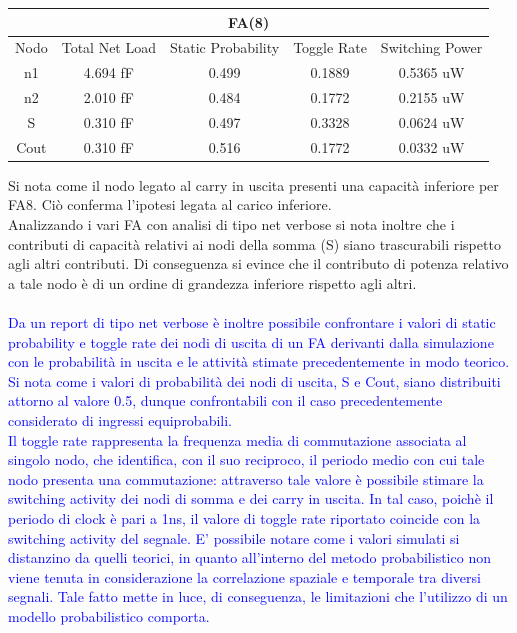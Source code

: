 \documentclass[11pt,  english, makeidx, a4paper, titlepage, oneside]{book}
\begin{document}
\vspace{0.3cm}
\begin{center}
	\begin{tabular}{|c|c|c|c|c|}
	\multicolumn{5}{c}{FA(8) }\\
	\hline
	Nodo &  Total Net Load & Static Probability & Toggle Rate & Switching Power \\ 
	\hline
	n1 & 4.694 fF & 0.499 & 0.1889 & 0.5365 uW  \\
	\hline
	n2 & 2.010 fF & 0.484 & 0.1772 & 0.2155 uW  \\
	\hline
	S & 0.310 fF & 0.497 & 0.3328 & 0.0624 uW  \\
	\hline
	Cout & 0.310 fF & 0.516 &  0.1772 & 0.0332 uW  \\
	\hline
	\end{tabular}
\end{center}
\vspace{0.3cm}
Si nota come il nodo legato al carry in uscita presenti una capacità inferiore per FA8. Ciò conferma l'ipotesi legata al carico inferiore.
\\
Analizzando i vari FA con analisi di tipo net verbose si nota inoltre che i contributi di capacità relativi ai nodi della somma (S) siano trascurabili rispetto agli altri contributi.
Di conseguenza si evince che il contributo di potenza relativo a tale nodo è di un ordine di grandezza inferiore rispetto agli altri.
\\\\
\textcolor{blue}{
Da un report di tipo net verbose è inoltre possibile confrontare i valori di static probability e toggle rate \textcolor{blue}{dei nodi di uscita di} un FA derivanti dalla simulazione con le probabilità in uscita e le attività stimate precedentemente in modo teorico. 
\\
Si nota come i valori di probabilità dei
nodi di uscita, S e Cout, siano distribuiti attorno al valore 0.5, dunque confrontabili con il caso precedentemente considerato di ingressi equiprobabili. 
\\
Il toggle rate rappresenta la frequenza media di commutazione associata al singolo nodo, che identifica, con il suo reciproco, il periodo medio
con cui tale nodo presenta una commutazione: attraverso tale valore è possibile stimare la switching activity dei nodi di somma e dei carry in uscita. In tal caso, poichè il periodo di clock è pari a 1ns, il valore di toggle rate riportato coincide con la switching activity del segnale. E' possibile notare come i valori simulati si distanzino da quelli teorici, in quanto all'interno del metodo probabilistico non viene tenuta in considerazione la correlazione spaziale e temporale tra diversi segnali. Tale fatto mette in luce, di conseguenza, le limitazioni che l'utilizzo di un modello probabilistico comporta.}
\end{document}

